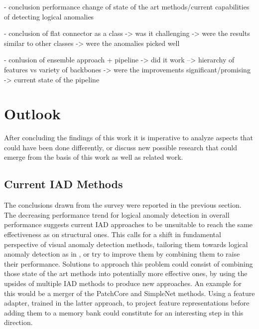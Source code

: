 - conclusion performance change of state of the art methods/current capabilities of detecting logical anomalies\newline

- conclusion of flat connector as a class\newline
-> was it challenging\newline
-> were the results similar to other classes\newline
-> were the anomalies picked well%

- conlusion of ensemble approach + pipeline\newline
-> did it work\newline
--> hierarchy of features vs variety of backbones\newline
-> were the improvements significant/promising\newline
-> current state of the pipeline\newline




\section{Outlook}
\label{sec:finaloutlook}

After concluding the findings of this work it is imperative to analyze aspects that could have been done differently, or discuss new possible research that could emerge from 
the basis of this work as well as related work.\newline

\subsection{Current IAD Methods}
The conclusions drawn from the survey were reported in the previous section. The decreasing performance trend for logical anomaly detection in overall performance suggests 
current IAD approaches to be unsuitable to reach the same effectiveness as on structural ones. This calls for a shift in fundamental perspective of visual anomaly 
detection methods, tailoring them towards logical anomaly detection as in \cite{LOCODentsAndScratchesBergmann2022}, or try to improve them by combining them to raise their performance. Solutions to approach this problem could consist of combining 
those state of the art methods into potentially more effective ones, by using the upsides of multiple IAD methods to produce new approaches. An example for this would be a 
merger of the PatchCore \cite{patchCore2022} and SimpleNet \cite{liu2023simplenet} methods. Using a feature adapter, trained in the latter approach, to project feature 
representations before adding them to a memory bank could constitute for an interesting step in this direction. 

